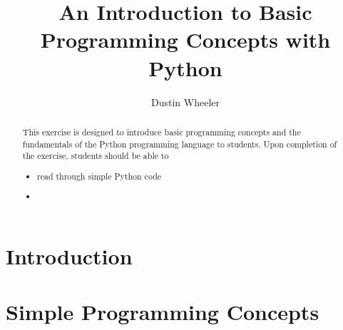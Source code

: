 \documentclass[nobib,nofonts,nols,nohyper]{tufte-handout}
\title{An Introduction to Basic Programming Concepts with Python}
\author{Dustin Wheeler}
\begin{document}
\maketitle

\begin{abstract}
	\noindent
  This exercise is designed to introduce basic programming concepts and the
  fundamentals of the Python programming language to students.
  Upon completion of the exercise, students should be able to
  \begin{itemize}
    \item read through simple Python code
    \item
  \end{itemize}
\end{abstract}

\section{Introduction} %
\label{sec:intro}



\section{Simple Programming Concepts} %
\label{sec:simple_programming_concepts}




\nocite{*}
\printbibliography[category=cited]%

\printbibliography[%
  title={Further Reading},%
  resetnumbers,%
  omitnumbers,%
	notcategory=cited,%
	keyword=python,%
	]
\end{document}
